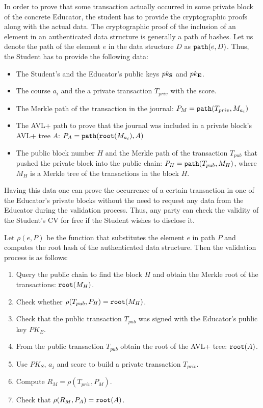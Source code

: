 In order to prove that some transaction actually occurred in some private block of the concrete Educator, the student has to provide the cryptographic proofs along with the actual data. The cryptographic proof of the inclusion of an element in an authenticated data structure is generally a path of hashes. Let us denote the path of the element $e$ in the data structure $D$ as $\mathtt{path}(e, D)$. Thus, the Student has to  provide the following data:
\begin{itemize}
  \item The Student's and the Educator's public keys $pk_{\mathbf{S}}$ and $pk_{\mathbf{E}}$.
  \item The course $a_i$ and the a private transaction $T_{priv}$ with the score.
  \item The Merkle path of the transaction in the journal: $P_{M} = \mathtt{path}(T_{priv}, M_{a_i})$
  \item The AVL+ path to prove that the journal was included in a private block's AVL+ tree $A$: $P_{A} = \mathtt{path}(\mathtt{root}(M_{a_i}), A)$
  \item The public block number $H$ and the Merkle path of the transaction $T_{pub}$ that pushed the private block into the public chain: $P_{H} = \mathtt{path}(T_{pub}, M_H)$, where $M_H$ is a Merkle tree of the transactions in the block $H$.
\end{itemize}

Having this data one can prove the occurrence of a certain transaction in one of the Educator's private blocks without the need to request any data from the Educator during the validation process. Thus, any party can check the validity of the Student's CV for free if the Student wishes to disclose it.

Let $\rho(e, P)$ be the function that substitutes the element $e$ in path $P$ and computes the root hash of the authenticated data structure. Then the validation process is as follows:
\begin{enumerate}
\item Query the public chain to find the block $H$ and obtain the Merkle root of the transactions: $\mathtt{root}(M_H)$.
\item Check whether $\rho(T_{pub}, P_{H}) = \mathtt{root}(M_H)$.
\item Check that the public transaction $T_{pub}$ was signed with the Educator's public key $PK_E$.
\item From the public transaction $T_{pub}$ obtain the root of the AVL+ tree: $\mathtt{root}(A)$.
\item Use $PK_S$, $a_j$ and score to build a private transaction $T_{priv}$.
\item Compute $R_{M} = \rho(T_{priv}, P_{M})$.
\item Check that $\rho(R_{M}, P_{A}) = \mathtt{root}(A)$.
\end{enumerate}

